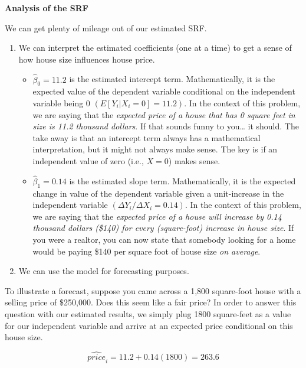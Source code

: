 \documentclass[
]{book}
\newenvironment{Shaded}{\begin{snugshade}}{\end{snugshade}}
\newcommand{\AttributeTok}[1]{\textcolor[rgb]{0.77,0.63,0.00}{#1}}
\newcommand{\DecValTok}[1]{\textcolor[rgb]{0.00,0.00,0.81}{#1}}
\newcommand{\FunctionTok}[1]{\textcolor[rgb]{0.00,0.00,0.00}{#1}}
\newcommand{\NormalTok}[1]{#1}
\newcommand{\OtherTok}[1]{\textcolor[rgb]{0.56,0.35,0.01}{#1}}
\newcommand{\SpecialCharTok}[1]{\textcolor[rgb]{0.00,0.00,0.00}{#1}}
\begin{document}
\textbf{Analysis of the SRF}

We can get plenty of mileage out of our estimated SRF.

\begin{enumerate}
\def\labelenumi{\arabic{enumi}.}
\item
  We can interpret the estimated coefficients (one at a time) to get a sense of how house size influences house price.

  \begin{itemize}
  \item
    \(\hat{\beta}_0=11.2\) is the estimated intercept term. Mathematically, it is the expected value of the dependent variable conditional on the independent variable being 0 \((E[Y_i|X_i=0]=11.2)\). In the context of this problem, we are saying that the \emph{expected price of a house that has 0 square feet in size is 11.2 thousand dollars}. If that sounds funny to you\ldots{} it should. The take away is that an intercept term always has a mathematical interpretation, but it might not always make sense. The key is if an independent value of zero (i.e., \(X=0\)) makes sense.
  \item
    \(\hat{\beta}_1=0.14\) is the estimated slope term. Mathematically, it is the expected change in value of the dependent variable given a unit-increase in the independent variable \((\Delta Y_i/\Delta X_i=0.14)\). In the context of this problem, we are saying that the \emph{expected price of a house will increase by 0.14 thousand dollars (\$140) for every (square-foot) increase in house size}. If you were a realtor, you can now state that somebody looking for a home would be paying \$140 per square foot of house size \emph{on average}.
  \end{itemize}
\item
  We can use the model for forecasting purposes.
\end{enumerate}

To illustrate a forecast, suppose you came across a 1,800 square-foot house with a selling price of \$250,000. Does this seem like a fair price? In order to answer this question with our estimated results, we simply plug 1800 square-feet as a value for our independent variable and arrive at an expected price conditional on this house size.

\[\hat{price}_i=11.2+0.14(1800)=263.6\]

\begin{Shaded}
\end{Shaded}
\end{document}
